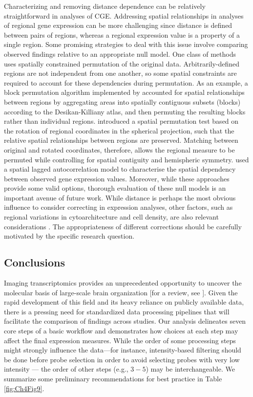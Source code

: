 \documentclass[10pt,A4]{article}
\begin{document}
Characterizing and removing distance dependence can be relatively straightforward in analyses of CGE. Addressing spatial relationships in analyses of regional gene expression can be more challenging since distance is defined between pairs of regions, whereas a regional expression value is a property of a single region. Some promising strategies to deal with this issue involve comparing observed findings relative to an appropriate null model. One class of methods uses spatially constrained permutation of the original data. Arbitrarily-defined regions are not independent from one another, so some spatial constraints are required to account for these dependencies during permutation. As an example, a block permutation algorithm implemented by \citet{Vertes2016b} accounted for spatial relationships between regions by aggregating areas into spatially contiguous subsets (blocks) according to the Desikan-Killiany atlas, and then permuting the resulting blocks rather than individual regions. \citet{Vasa2018} introduced a spatial permutation test based on the rotation of regional coordinates in the spherical projection, such that the relative spatial relationships between regions are preserved. Matching between original and rotated coordinates, therefore, allows the regional measure to be permuted while controlling for spatial contiguity and hemispheric symmetry. \citet{Burt2018} used a spatial lagged autocorrelation model to characterise the spatial dependency between observed gene expression values. Moreover, while these approaches provide some valid options, thorough evaluation of these null models is an important avenue of future work. While distance is perhaps the most obvious influence to consider correcting in expression analyses, other factors, such as regional variations in cytoarchitecture and cell density, are also relevant considerations \citep{Barbas2016,Burt2018}. The appropriateness of different corrections should be carefully motivated by the specific research question.

\clearpage

\subsection*{Conclusions}

Imaging transcriptomics provides an unprecedented opportunity to uncover the molecular basis of large-scale brain organization [for a review, see \citep{Fornito2018}]. Given the rapid development of this field and its heavy reliance on publicly available data, there is a pressing need for standardized data processing pipelines that will facilitate the comparison of findings across studies. Our analysis delineates seven core steps of a basic workflow and demonstrates how choices at each step may affect the final expression measures. While the order of some processing steps might strongly influence the data---for instance, intensity-based filtering should be done before probe selection in order to avoid selecting probes with very low intensity — the order of other steps (e.g., $3-5$) may be interchangeable. We summarize some preliminary recommendations for best practice in Table \ref{fig:Ch4Fig9}.
\end{document}
